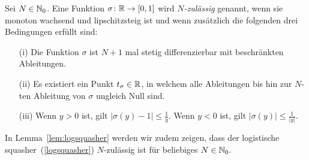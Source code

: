 \begin{defn}
\label{nzulässig}
Sei $N \in \mathbb{N}_0$. Eine Funktion $\sigma\colon \mathbb{R} \to [0, 1]$ wird \emph{$N$-zulässig} genannt, wenn sie monoton wachsend und lipschitzsteig \cite{forster2016} ist und wenn zusätzlich die folgenden drei Bedingungen erfüllt sind:
\begin{itemize}
\item[(i)] Die Funktion $\sigma$ ist $N + 1$ mal stetig differenzierbar mit beschränkten Ableitungen.
\item[(ii)] Es existiert ein Punkt $t_{\sigma} \in \mathbb{R}$, in welchem alle Ableitungen bis hin zur $N$-ten Ableitung von $\sigma$ ungleich Null sind.
\item[(iii)] Wenn $y > 0$ ist, gilt $|\sigma(y) - 1| \leq \frac{1}{y}$. Wenn $y < 0$ ist, gilt $|\sigma(y)| \leq \frac{1}{|y|}$.
\end{itemize}  
\end{defn}  

In Lemma~\ref{lem:logsquasher} werden wir zudem zeigen, dass der logistische squasher~(\ref{logsquasher}) $N$-zulässig ist für beliebiges $N \in \mathbb{N}_0.$ 

